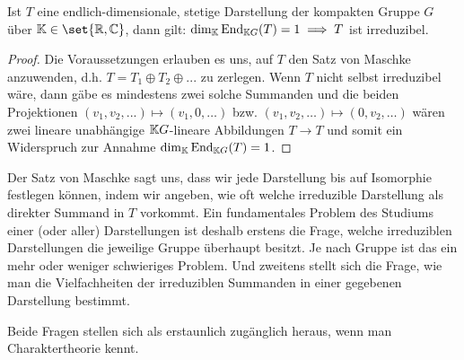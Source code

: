 \begin{corollary}\label{darstellungen:schur_umkehrung}
Ist $T$ eine endlich-dimensionale, stetige Darstellung der kompakten Gruppe $G$ über $\IK\in\set{\IR,\IC}$, dann gilt: $\dim_{\mathbb{K}} \operatorname{End}_{\mathbb{K} G}(T) = 1 \implies T$ ist irreduzibel.
\end{corollary}
\begin{proof}
Die Voraussetzungen erlauben es uns, auf $T$ den Satz von Maschke anzuwenden, d.h. $T=T_1\oplus T_2\oplus ...$ zu zerlegen. Wenn $T$ nicht selbst irreduzibel wäre, dann gäbe es mindestens zwei solche Summanden und die beiden Projektionen $(v_1,v_2, ...) \mapsto (v_1,0,\ldots)$ bzw. $(v_1,v_2,\ldots)\mapsto (0,v_2,\ldots)$ wären zwei lineare unabhängige $\mathbb{K} G$-lineare Abbildungen $T\to T$ und somit ein Widerspruch zur Annahme $\dim_{\mathbb{K}} \operatorname{End}_{\mathbb{K} G}(T)=1$.
\end{proof}

\begin{remark}
Der Satz von Maschke sagt uns, dass wir jede Darstellung bis auf Isomorphie festlegen können, indem wir angeben, wie oft welche irreduzible Darstellung als direkter Summand in $T$ vorkommt. Ein fundamentales Problem des Studiums einer (oder aller) Darstellungen ist deshalb erstens die Frage, welche irreduziblen Darstellungen die jeweilige Gruppe überhaupt besitzt. Je nach Gruppe ist das ein mehr oder weniger schwieriges Problem. Und zweitens stellt sich die Frage, wie man die Vielfachheiten der irreduziblen Summanden in einer gegebenen Darstellung bestimmt.

Beide Fragen stellen sich als erstaunlich zugänglich heraus, wenn man Charaktertheorie kennt.
\end{remark}